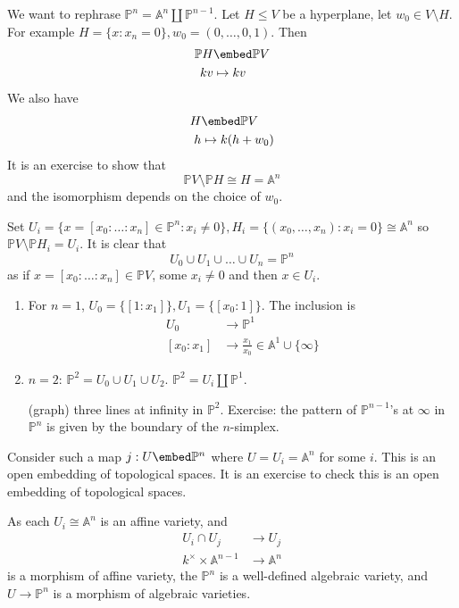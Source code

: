 \documentclass[a4paper]{article}
\renewcommand{\A}{\mathbb{A}}
\renewcommand*{\P}{\mathbb{P}}
\begin{document}
We want to rephrase \(\P^n = \A^n \amalg \P^{n - 1}\). Let \(H \leq V\) be a hyperplane, let \(w_0 \in V \setminus H\). For example \(H = \{x: x_n = 0\}, w_0 = (0, \dots, 0, 1)\). Then
\begin{align*}
  \P H &\embed \P V \\
  kv &\mapsto kv
\end{align*}
We also have
\begin{align*}
  H &\embed \P V \\
  h &\mapsto k(h + w_0)
\end{align*}
It is an exercise to show that
\[
  \P V \setminus \P H \cong H = \A^n
\]
and the isomorphism depends on the choice of \(w_0\).

Set \(U_i = \{x = [x_0: \dots : x_n] \in \P^n: x_i \neq 0\}, H_i = \{(x_0, \dots, x_n): x_i = 0\} \cong \A^n\) so \(\P V \setminus \P H_i = U_i\). It is clear that
\[
  U_0 \cup U_1 \cup \dots \cup U_n = \P^n
\]
as if \(x = [x_0 : \dots : x_n] \in \P V\), some \(x_i \neq 0\) and then \(x \in U_i\).

\begin{eg}\leavevmode
  \begin{enumerate}
  \item For \(n = 1\), \(U_0 = \{[1: x_1]\}, U_1 = \{[x_0 : 1]\}\). The inclusion is
    \begin{align*}
      U_0 &\to \P^1 \\
      [x_0 : x_1] &\to \frac{x_1}{x_0} \in \A^1 \cup \{\infty\}
    \end{align*}
  \item \(n = 2\): \(\P^2 = U_0 \cup U_1 \cup U_2\). \(\P^2 = U_i \amalg \P^1\).

    (graph) three lines at infinity in \(\P^2\). Exercise: the pattern of \(\P^{n - 1}\)'s at \(\infty\) in \(\P^n\) is given by the boundary of the \(n\)-simplex.
  \end{enumerate}
\end{eg}

Consider such a map \(j: U \embed \P^n\) where \(U = U_i = \A^n\) for some \(i\). This is an open embedding of topological spaces. It is an exercise to check this is an open embedding of topological spaces.

As each \(U_i \cong \A^n\) is an affine variety, and
\begin{align*}
  U_i \cap U_j &\to U_j \\
  k^\times \times \A^{n - 1} &\to \A^n
\end{align*}
is a morphism of affine variety, the \(\P^n\) is a well-defined algebraic variety, and \(U \to \P^n\) is a morphism of algebraic varieties.
\end{document}
